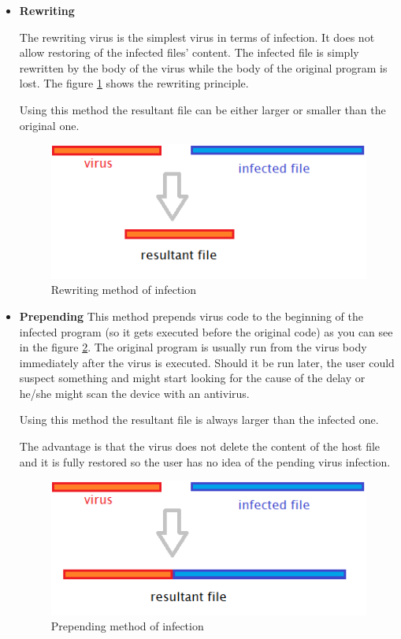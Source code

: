 \documentclass[review]{elsarticle}
\begin{document}
\begin{itemize}
\item \textbf{Rewriting}
\label{page:rewriting}

The rewriting virus is the simplest virus in terms of infection. It does not allow restoring of the infected files' content. The infected file is simply rewritten by the body of the virus while the body of the original program is lost. The figure \ref{pict:rewriting} shows the rewriting principle.

Using this method the resultant file can be either larger or smaller than the original one.

\begin{figure}[ht]
\center
\caption{Rewriting method of infection}
\label{pict:rewriting}
\includegraphics[scale=0.6]{pict/rewriting.png}
\end{figure}

\item \textbf{Prepending}
\label{page:prepend}
This method prepends virus code to the beginning of the infected program (so it gets executed before the original code) as you can see in the figure \ref{pict:prepend}. The original program is usually run from the virus body immediately after the virus is executed. Should it be run later, the user could suspect something and might start looking for the cause of the delay or he/she might scan the device with an antivirus.

Using this method the resultant file is always larger than the infected one.

The advantage is that the virus does not delete the content of the host file and it is fully restored so the user has no idea of the pending virus infection.

\begin{figure}[h!t]
\center
\caption{Prepending method of infection}
\label{pict:prepend}
\includegraphics[scale=0.6]{pict/prepended.png}
\end{figure}


\end{itemize}
\end{document}
